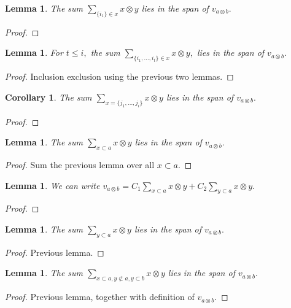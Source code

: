 \documentclass{amsart}
\newtheorem{cor}[subsubsection]{Corollary}
\newtheorem{lem}[subsubsection]{Lemma}
\begin{document}
\begin{lem}
The sum $\sum_{\{i_1\}\in x}^{}x\otimes y$ lies in the span of $v_{a\otimes b}.$
\end{lem}
\begin{proof}

\end{proof}

\begin{lem}
For $t \leq i,$ the sum $\sum_{\{i_1,\ldots, i_t\}\in x}^{}x\otimes y,$ lies in the span of $v_{a\otimes b}.$
\end{lem}
\begin{proof}
Inclusion exclusion using the previous two lemmas.
\end{proof}

\begin{cor}
The sum $\sum_{x = \{j_1,\ldots, j_i\}}^{}x\otimes y$ lies in the span of $v_{a \otimes b}.$
\end{cor}
\begin{proof}

\end{proof}

\begin{lem}
The sum $\sum_{x \subset a}^{}x\otimes y$ lies in the span of $v_{a \otimes b}.$
\end{lem}
\begin{proof}
Sum the previous lemma over all $x \subset a.$
\end{proof}

\begin{lem}
We can write $v_{a\otimes b} = C_1\sum_{x\subset a}^{}x\otimes y + C_2\sum_{y \subset a}^{}x\otimes y.$
\end{lem}
\begin{proof}

\end{proof}

\begin{lem}
The sum $\sum_{y \subset a}^{}x\otimes y$ lies in the span of $v_{a \otimes b}.$
\end{lem}
\begin{proof}
Previous lemma.
\end{proof}

\begin{lem}
The sum $\sum_{x \subset a,y\not\subset a,y\subset b}^{}x\otimes y$ lies in the span of $v_{a \otimes b}.$
\end{lem}
\begin{proof}
Previous lemma, together with definition of $v_{a\otimes b}.$
\end{proof}
\end{document}
